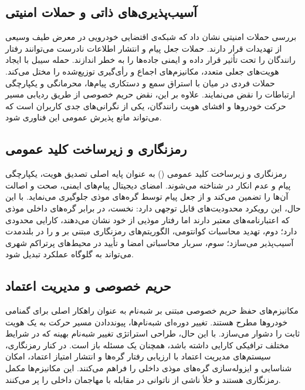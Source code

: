 \documentclass[12pt,a4paper]{article}
\begin{document}
\subsection{آسیب‌پذیری‌های ذاتی و حملات امنیتی}
بررسی حملات امنیتی نشان داد که شبکه‌ی اقتضایی خودرویی در معرض طیف وسیعی از تهدیدات قرار دارند. حملات جعل پیام و انتشار اطلاعات نادرست می‌توانند رفتار رانندگان را تحت تأثیر قرار داده و ایمنی جاده‌ها را به خطر اندازند. حمله سیبل با ایجاد هویت‌های جعلی متعدد، مکانیزم‌های اجماع و رأی‌گیری توزیع‌شده را مختل می‌کند. حملات فردی در میان با استراق سمع و دستکاری پیام‌ها، محرمانگی و یکپارچگی ارتباطات را نقض می‌نمایند. علاوه بر این، نقض حریم خصوصی از طریق ردیابی مسیر حرکت خودروها و افشای هویت رانندگان، یکی از نگرانی‌های جدی کاربران است که می‌تواند مانع پذیرش عمومی این فناوری شود.

\subsection{رمزنگاری و زیرساخت کلید عمومی}
رمزنگاری و زیرساخت کلید عمومی () به عنوان پایه اصلی تصدیق هویت، یکپارچگی پیام و عدم انکار در  شناخته می‌شوند. امضای دیجیتال پیام‌های ایمنی، صحت و اصالت آن‌ها را تضمین می‌کند و از جعل پیام توسط گره‌های موذی جلوگیری می‌نماید. با این حال، این رویکرد محدودیت‌های قابل توجهی دارد: نخست،  در برابر گره‌های داخلی موذی که اعتبارنامه‌های معتبر دارند اما رفتار موذیی از خود نشان می‌دهند، کارایی محدودی دارد؛ دوم، تهدید محاسبات کوانتومی، الگوریتم‌های رمزنگاری مبتنی بر  و  را در بلندمدت آسیب‌پذیر می‌سازد؛ سوم، سربار محاسباتی امضا و تأیید در محیط‌های پرتراکم شهری می‌تواند به گلوگاه عملکرد تبدیل شود.

\subsection{حریم خصوصی و مدیریت اعتماد}
مکانیزم‌های حفظ حریم خصوصی مبتنی بر شبه‌نام به عنوان راهکار اصلی برای گمنامی خودروها مطرح هستند. تغییر دوره‌ای شبه‌نام‌ها، پیونددادن مسیر حرکت به یک هویت ثابت را دشوار می‌سازد. با این حال، طراحی استراتژی تغییر شبه‌نام بهینه که در شرایط مختلف ترافیکی کارایی داشته باشد، همچنان یک مسئله باز است. در کنار رمزنگاری، سیستم‌های مدیریت اعتماد با ارزیابی رفتار گره‌ها و انتشار امتیاز اعتماد، امکان شناسایی و ایزوله‌سازی گره‌های موذی داخلی را فراهم می‌کنند. این مکانیزم‌ها مکمل رمزنگاری هستند و خلأ ناشی از ناتوانی  در مقابله با مهاجمان داخلی را پر می‌کنند.
\end{document}
